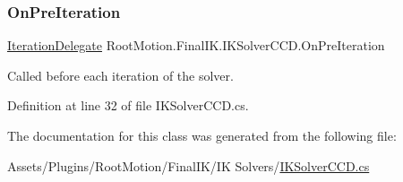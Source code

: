 \subsubsection{\texorpdfstring{On\+Pre\+Iteration}{OnPreIteration}}
{\footnotesize\ttfamily \mbox{\hyperlink{class_root_motion_1_1_final_i_k_1_1_i_k_solver_ae3da6a8ccd8224ce56d15c4da5cd1ef7}{Iteration\+Delegate}} Root\+Motion.\+Final\+I\+K.\+I\+K\+Solver\+C\+C\+D.\+On\+Pre\+Iteration}



Called before each iteration of the solver. 



Definition at line 32 of file I\+K\+Solver\+C\+C\+D.\+cs.



The documentation for this class was generated from the following file\+:\begin{DoxyCompactItemize}
\item 
Assets/\+Plugins/\+Root\+Motion/\+Final\+I\+K/\+I\+K Solvers/\mbox{\hyperlink{_i_k_solver_c_c_d_8cs}{I\+K\+Solver\+C\+C\+D.\+cs}}\end{DoxyCompactItemize}
